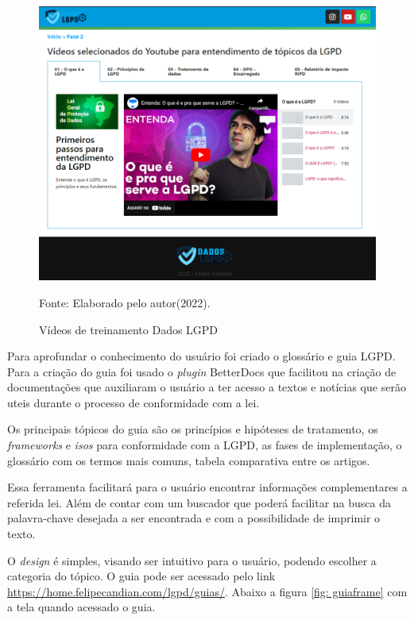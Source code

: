 \documentclass[
	12pt,				%
	openright,			%
	oneside,			%
	a4paper,			%
	english,			%
	french,				%
	spanish,			%
	brazil,				%
	]{abntex2}
\begin{document}
\begin{figure}[ht]
    \centering
    \caption{Vídeos de treinamento Dados LGPD}
    \includegraphics[width=6.5in]{Images/fase2.png}
    \label{fig: workshop}
    
    \centering \small Fonte: Elaborado pelo autor(2022).
\end{figure}

Para aprofundar o conhecimento do usuário foi criado o glossário e guia LGPD. Para a criação do guia foi usado o \textit{plugin} BetterDocs que facilitou na criação de documentações que auxiliaram o usuário a ter acesso a textos e notícias que serão uteis durante o processo de conformidade com a lei. 

\pagebreak

Os principais tópicos do guia são os princípios e hipóteses de tratamento, os \textit{frameworks} e \textit{isos} para conformidade com a LGPD, as fases de implementação, o glossário com os termos mais comuns, tabela comparativa entre os artigos.

Essa ferramenta facilitará para o usuário encontrar informações complementares a referida lei. Além de contar com um buscador que poderá facilitar na busca da palavra-chave desejada a ser encontrada e com a possibilidade de imprimir o texto.

O \textit{design} é simples, visando ser intuitivo para o usuário, podendo escolher a categoria do tópico. O guia pode ser acessado pelo link \url{https://home.felipecandian.com/lgpd/guias/}. Abaixo a figura \ref{fig: guiaframe} com a tela quando acessado o guia. 
\end{document}
